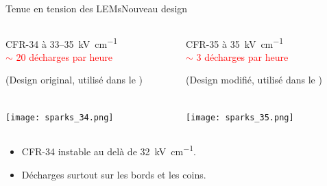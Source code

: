     \begin{frame}{Tenue en tension des LEMs}{Nouveau design}
        \vspace{-0.4cm}
   		\begin{columns}
    		\begin{column}{0.5\textwidth}
    			\begin{center}
	    			\begin{scriptsize}
		    			CFR-34 à 33--\SI{35}{\kilo\volt\per\centi\meter}\\
		    			\textcolor{red}{$\sim$ 20 décharges par heure}\\
		    		\end{scriptsize}
	    			\begin{tiny}
		    			(Design original, utilisé dans le \TOO{})
		    		\end{tiny}\\
	    			\texttt{[image: sparks\_34.png]}
    			\end{center}
    		\end{column}\hfill
    		\begin{column}{0.5\textwidth}
    			\begin{center}
	    			\begin{scriptsize}
		    			CFR-35 à \SI{35}{\kilo\volt\per\centi\meter} \\
		    			\textcolor{red}{$\sim$ 3 décharges par heure}\\
		    		\end{scriptsize}
	    			\begin{tiny}
	    				(Design modifié, utilisé dans le \SSS{})
	   				\end{tiny}\\
	    			\texttt{[image: sparks\_35.png]}
	    		\end{center}
    		\end{column}
    	\end{columns}\vspace{0.1cm}
    	\begin{columns}
    		\begin{column}{0.5\textwidth}
    			\begin{scriptsize}
	    			\begin{itemize}
	    				\item CFR-34 instable au delà de \SI{32}{\kilo\volt\per\centi\meter}.
	    				\item Décharges surtout sur les bords et les coins.
	    			\end{itemize}
	    			\begin{itemize}

\end{itemize}
\end{scriptsize}
\end{column}
\end{columns}
\end{frame}
